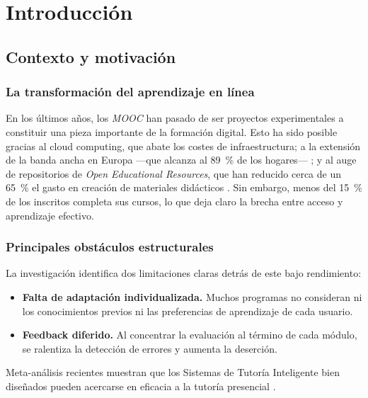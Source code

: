 
\chapter{Introducción}
\justifying

\section{Contexto y motivación}
\label{sec:contexto-motivacion}

\subsection*{La transformación del aprendizaje en línea}

En los últimos años, los \emph{MOOC} han pasado de ser proyectos experimentales a constituir una pieza importante de la formación digital. Esto ha sido posible gracias al cloud computing, que abate los costes de infraestructura; a la extensión de la banda ancha en Europa —que alcanza al \SI{89}{\percent} de los hogares— \cite{Eurostat2024}; y al auge de repositorios de \emph{Open Educational Resources}, que han reducido cerca de un \SI{65}{\percent} el gasto en creación de materiales didácticos \cite{UNESCO2023OER}. Sin embargo, menos del \SI{15}{\percent} de los inscritos completa sus cursos, lo que deja claro la brecha entre acceso y aprendizaje efectivo.

\subsection*{Principales obstáculos estructurales}

La investigación identifica dos limitaciones claras detrás de este bajo rendimiento:  
\begin{itemize}[leftmargin=*]
  \item \textbf{Falta de adaptación individualizada.} Muchos programas no consideran ni los conocimientos previos ni las preferencias de aprendizaje de cada usuario.  
  \item \textbf{Feedback diferido.} Al concentrar la evaluación al término de cada módulo, se ralentiza la detección de errores y aumenta la deserción.  
\end{itemize}
Meta-análisis recientes muestran que los Sistemas de Tutoría Inteligente bien diseñados pueden acercarse en eficacia a la tutoría presencial \cite{Kulik2016}.

